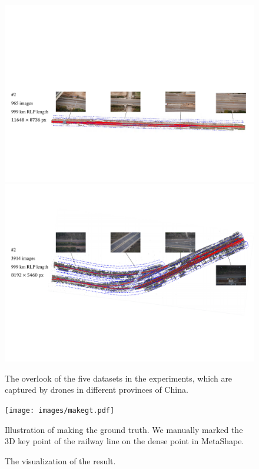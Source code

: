\begin{figure}
    \vspace{2em}
    \includegraphics[width=0.95\linewidth]{images/datasets/D965.pdf}%
    \vspace{2em}
    \includegraphics[width=0.95\linewidth]{images/datasets/D3914.pdf}%
    \caption{The overlook of the five datasets in the experiments,
    which are captured by drones in different provinces of China.}
    \label{fig:enter-label}
\end{figure}


\begin{figure}
    \centering
    \texttt{[image: images/makegt.pdf]}%
    \caption{Illustration of making the ground truth.
    We manually marked the 3D key point of the railway line on the dense point in MetaShape.}
    \label{fig:makegt}
\end{figure}

\begin{figure}
    \centering
    \caption{The visualization of the result.}
    \label{fig:resvisual}
\end{figure}

